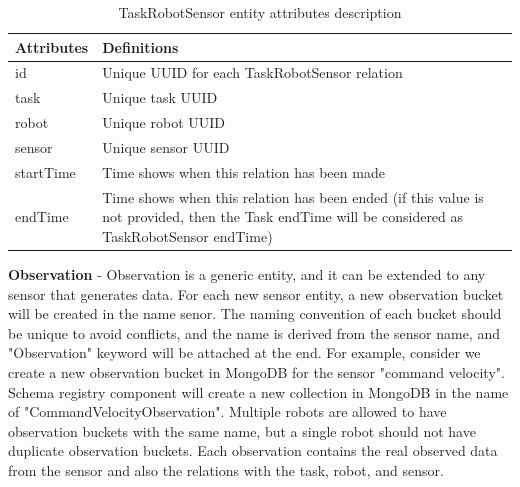 	\begin{table}[h!]
		\begin{tabular}{|l|p{12cm}|}
			\hline
			\textbf{Attributes} & \textbf{Definitions} \\ \hline

			id &  Unique UUID for each TaskRobotSensor relation \\ \hline			
			task & Unique task UUID \\ \hline
			robot & Unique robot UUID \\ \hline
			sensor & Unique sensor UUID \\ \hline
			startTime & Time shows when this relation has been made \\ \hline
			endTime & Time shows when this relation has been ended (if this value is not provided, then the Task endTime will be considered as TaskRobotSensor endTime) \\ \hline
			
		\end{tabular}
		\caption{TaskRobotSensor entity attributes description}
		\label{tab:TaskRobotSensor}
	\end{table}

	\textbf{Observation} - Observation is a generic entity, and it can be extended to any sensor that generates data. For each new sensor entity, a new observation bucket will be created in the name senor. The naming convention of each bucket should be unique to avoid conflicts, and the name is derived from the sensor name, and "Observation" keyword will be attached at the end. For example, consider we create a new observation bucket in MongoDB for the sensor "command velocity". Schema registry component will create a new collection in MongoDB in the name of "CommandVelocityObservation". Multiple robots are allowed to have observation buckets with the same name, but a single robot should not have duplicate observation buckets. Each observation contains the real observed data from the sensor and also the relations with the task, robot, and sensor.


